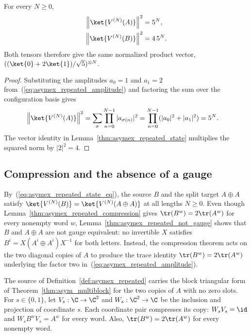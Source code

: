 \begin{lemma}
    \label{thm:asymex_repeated_norm}
    \leanok
    For every $N\geq0$,
    \begin{align}
        \left\|\ket{V^{(N)}(A)}\right\|^2 & =5^N, \notag \\
        \left\|\ket{V^{(N)}(B)}\right\|^2 & =4\,5^N.
        \notag
    \end{align}
    Both tensors therefore give the same normalized product vector,
    $((\ket{0}+2\ket{1})/\sqrt{5})^{\otimes N}$.
\end{lemma}

\begin{proof}
    \leanok
    Substituting the amplitudes $a_0=1$ and $a_1=2$
    from~(\ref{eq:asymex_repeated_amplitude}) and factoring the sum over
    the configuration basis gives
    \begin{align}
        \left\|\ket{V^{(N)}(A)}\right\|^2
         & =\sum_\sigma\prod_{n=0}^{N-1}|a_{\sigma(n)}|^2
        =\prod_{n=0}^{N-1}(|a_0|^2+|a_1|^2)
        =5^N.
        \notag
    \end{align}
    The vector identity in Lemma~\ref{thm:asymex_repeated_state}
    multiplies the squared norm by $|2|^2=4$.
\end{proof}

\subsection{Compression and the absence of a gauge}

By~(\ref{eq:asymex_repeated_state_eq}), the source $B$ and the split
target $A\oplus A$ satisfy $\ket{V^{(N)}(B)}=\ket{V^{(N)}(A\oplus A)}$
at all lengths $N\geq0$. Even though
Lemma~\ref{thm:asymex_repeated_compression} gives
$\tr(B^w)=2\tr(A^w)$ for every nonempty word $w$,
Lemma~\ref{thm:asymex_repeated_not_gauge} shows that $B$ and
$A\oplus A$ are not gauge equivalent: no invertible $X$ satisfies
$B^i=X(A^i\oplus A^i)X^{-1}$ for both letters. Instead, the compression
theorem acts on the two diagonal copies of $A$ to produce the trace
identity $\tr(B^w)=2\tr(A^w)$ underlying the factor two
in~(\ref{eq:asymex_repeated_amplitude}).

\begin{lemma}
    \label{thm:asymex_repeated_compression}
    \leanok
    The source of Definition~\ref{def:asymex_repeated} carries the block
    triangular form of Theorem~\ref{thm:asym_multiblock} for the two copies
    of $A$ with no zero slots. For $s\in\{0,1\}$, let $V_s:\C\to\C^2$
    and $W_s:\C^2\to\C$ be the inclusion and projection of coordinate $s$.
    Each coordinate pair compresses its copy:
    $W_sV_s=\id$ and $W_sB^wV_s=A^w$ for every word.
    Also, $\tr(B^w)=2\tr(A^w)$ for every nonempty word.
\end{lemma}

